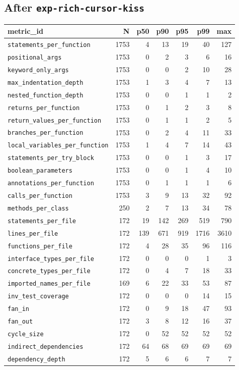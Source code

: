 \documentclass[11pt]{article}
\begin{document}
\subsection{After \texttt{exp-rich-cursor-kiss}}
\label{app:kiss-cursor-kiss}

{\scriptsize
\begin{longtable}{@{}lrrrrrr@{}}
  \toprule
  metric\_id & N & p50 & p90 & p95 & p99 & max \\
  \midrule
  \endhead
  \texttt{statements\_per\_function} & 1753 & 4 & 13 & 19 & 40 & 127 \\
  \texttt{positional\_args} & 1753 & 0 & 2 & 3 & 6 & 16 \\
  \texttt{keyword\_only\_args} & 1753 & 0 & 0 & 2 & 10 & 28 \\
  \texttt{max\_indentation\_depth} & 1753 & 1 & 3 & 4 & 7 & 13 \\
  \texttt{nested\_function\_depth} & 1753 & 0 & 0 & 1 & 1 & 2 \\
  \texttt{returns\_per\_function} & 1753 & 0 & 1 & 2 & 3 & 8 \\
  \texttt{return\_values\_per\_function} & 1753 & 0 & 1 & 1 & 2 & 5 \\
  \texttt{branches\_per\_function} & 1753 & 0 & 2 & 4 & 11 & 33 \\
  \texttt{local\_variables\_per\_function} & 1753 & 1 & 4 & 7 & 14 & 43 \\
  \texttt{statements\_per\_try\_block} & 1753 & 0 & 0 & 1 & 3 & 17 \\
  \texttt{boolean\_parameters} & 1753 & 0 & 0 & 1 & 4 & 10 \\
  \texttt{annotations\_per\_function} & 1753 & 0 & 1 & 1 & 1 & 6 \\
  \texttt{calls\_per\_function} & 1753 & 3 & 9 & 13 & 32 & 92 \\
  \texttt{methods\_per\_class} & 250 & 2 & 7 & 13 & 34 & 78 \\
  \texttt{statements\_per\_file} & 172 & 19 & 142 & 269 & 519 & 790 \\
  \texttt{lines\_per\_file} & 172 & 139 & 671 & 919 & 1716 & 3610 \\
  \texttt{functions\_per\_file} & 172 & 4 & 28 & 35 & 96 & 116 \\
  \texttt{interface\_types\_per\_file} & 172 & 0 & 0 & 0 & 1 & 3 \\
  \texttt{concrete\_types\_per\_file} & 172 & 0 & 4 & 7 & 18 & 33 \\
  \texttt{imported\_names\_per\_file} & 169 & 6 & 22 & 33 & 53 & 87 \\
  \texttt{inv\_test\_coverage} & 172 & 0 & 0 & 0 & 14 & 15 \\
  \texttt{fan\_in} & 172 & 0 & 9 & 18 & 47 & 93 \\
  \texttt{fan\_out} & 172 & 3 & 8 & 12 & 16 & 37 \\
  \texttt{cycle\_size} & 172 & 0 & 52 & 52 & 52 & 52 \\
  \texttt{indirect\_dependencies} & 172 & 64 & 68 & 69 & 69 & 69 \\
  \texttt{dependency\_depth} & 172 & 5 & 6 & 6 & 7 & 7 \\
  \bottomrule
\end{longtable}
}
\end{document}
